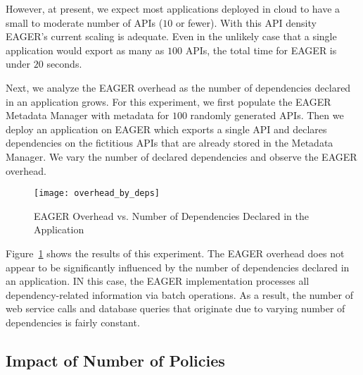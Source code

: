However, at present, we expect 
most applications deployed in cloud to have a small to moderate number of 
APIs ($10$ or fewer).  With this API density EAGER's current scaling is
adequate.
Even in the
unlikely case that a single application would export as many as $100$ APIs,
the total time for EAGER is under $20$ seconds.


Next, we analyze the EAGER overhead as the number of dependencies declared in
an application grows. For this experiment, we first populate the EAGER
Metadata Manager with metadata for $100$ randomly generated APIs. Then we
deploy an application on EAGER which exports a single API and declares
dependencies on the fictitious 
APIs that are already stored in the Metadata Manager. We
vary the number of declared dependencies and observe the EAGER overhead.

\begin{figure}
\centering
\texttt{[image: overhead\_by\_deps]}
\vspace{-0.01in}
\caption{EAGER Overhead vs. Number of Dependencies Declared in the Application}
\label{fig:overhead_by_deps}
\end{figure}

Figure~\ref{fig:overhead_by_deps} shows the results of this experiment. 
The EAGER overhead does not appear to be significantly
influenced by the number of dependencies declared in an application. 
IN this case, the EAGER implementation processes
all dependency-related information via batch operations. 
As a result, the number of web service calls and database queries that originate due to varying number of dependencies
is fairly constant. 

\subsection{Impact of Number of Policies}

